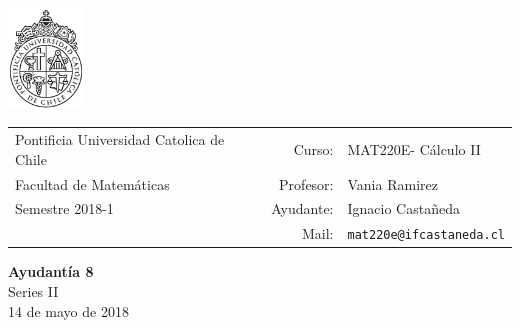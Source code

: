 \documentclass[12pt]{article}
\makeatletter
\newcommand{\ayudantia}{{\sc Ayudantía 8}}
\newcommand{\tituloayu}{Series II}
\newcommand{\fecha}{14 de mayo de 2018}
\newcommand{\sigla}{MAT220E}
\newcommand{\nombre}{Cálculo II}
\newcommand{\profesor}{Vania Ramirez}
\newcommand{\ano}{2018}
\newcommand{\semestre}{1}
\newcommand{\mail}{mat220e@ifcastaneda.cl}
\makeatother
\begin{document}
\thispagestyle{empty}

\begin{minipage}{2cm}
	\includegraphics[width=2cm]{../../../../img/logo.pdf}
	\vspace{0.5cm}
\end{minipage}
\begin{minipage}{\linewidth}
	\begin{tabular}{lrl}
		{\scriptsize\sc Pontificia Universidad Catolica de Chile} & \hspace*{0.7in}Curso: &
		\sigla  - \nombre\\
		{\sc Facultad de Matemáticas}&
		Profesor: & \profesor \\
		{\sc Semestre \ano-\semestre} & Ayudante: & {Ignacio Castañeda}\\
		& {Mail:} & \texttt{\mail}
	\end{tabular}
\end{minipage}

\vspace{-10mm}
\begin{center}
	{\LARGE\bf \ayudantia}\\
	\vspace{0.1cm}
	{\tituloayu}\\
	\vspace{0.1cm}
	\fecha\\
	\vspace{0.4cm}
\end{center}
\end{document}
